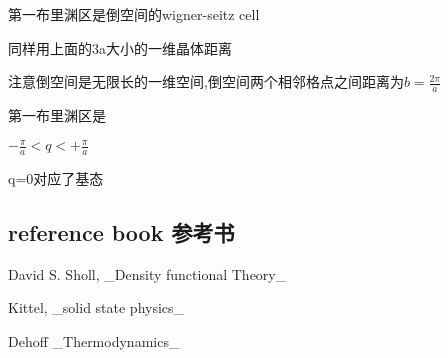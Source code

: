 \documentclass{article}
\begin{document}
第一布里渊区是倒空间的wigner-seitz cell

同样用上面的3a大小的一维晶体距离

注意倒空间是无限长的一维空间,倒空间两个相邻格点之间距离为$b=\frac{2\pi}{a}$

第一布里渊区是

$-\frac{\pi}{a}<q<+\frac{\pi}{a}$

q=0对应了基态



\subsection {reference book 参考书}

David S. Sholl, _Density functional Theory_

Kittel, _solid state physics_

Dehoff _Thermodynamics_
\end{document}

